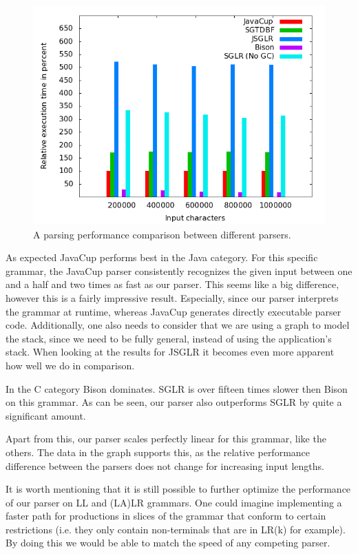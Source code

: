 \documentclass[a4paper,10pt]{article}
\begin{document}
\begin{figure}[H]
\centering
\includegraphics[scale=0.4]{vsLALR.png}
\caption{A parsing performance comparison between different parsers.}
\end{figure}

As expected JavaCup performs best in the Java category. For this specific grammar, the JavaCup parser consistently recognizes the given input between one and a half and two times as fast as our parser. This seems like a big difference, however this is a fairly impressive result. Especially, since our parser interprets the grammar at runtime, whereas JavaCup generates directly executable parser code. Additionally, one also needs to consider that we are using a graph to model the stack, since we need to be fully general, instead of using the application's stack. When looking at the results for JSGLR it becomes even more apparent how well we do in comparison.

In the C category Bison dominates. SGLR is over fifteen times slower then Bison on this grammar. As can be seen, our parser also outperforms SGLR by quite a significant amount.

Apart from this, our parser scales perfectly linear for this grammar, like the others. The data in the graph supports this, as the relative performance difference between the parsers does not change for increasing input lengths.

It is worth mentioning that it is still possible to further optimize the performance of our parser on LL and (LA)LR grammars. One could imagine implementing a faster path for productions in slices of the grammar that conform to certain restrictions (i.e. they only contain non-terminals that are in LR(k) for example). By doing this we would be able to match the speed of any competing parser.
\end{document}
